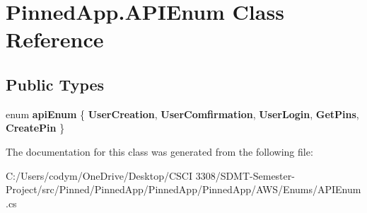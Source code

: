 \hypertarget{class_pinned_app_1_1_a_p_i_enum}{}\section{Pinned\+App.\+A\+P\+I\+Enum Class Reference}
\label{class_pinned_app_1_1_a_p_i_enum}
\subsection*{Public Types}
\begin{DoxyCompactItemize}
\item 
\mbox{\label{class_pinned_app_1_1_a_p_i_enum_ae6d78fe53523b1b3d55f4b353a84da7d}} 
enum {\bfseries api\+Enum} \{ \newline
{\bfseries User\+Creation}, 
{\bfseries User\+Comfirmation}, 
{\bfseries User\+Login}, 
{\bfseries Get\+Pins}, 
\newline
{\bfseries Create\+Pin}
 \}
\end{DoxyCompactItemize}


The documentation for this class was generated from the following file\+:\begin{DoxyCompactItemize}
\item 
C\+:/\+Users/codym/\+One\+Drive/\+Desktop/\+C\+S\+C\+I 3308/\+S\+D\+M\+T-\/\+Semester-\/\+Project/src/\+Pinned/\+Pinned\+App/\+Pinned\+App/\+Pinned\+App/\+A\+W\+S/\+Enums/A\+P\+I\+Enum.\+cs\end{DoxyCompactItemize}
